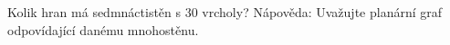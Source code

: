 Kolik hran má sedmnáctistěn s 30 vrcholy? Nápověda: Uvažujte planární graf
odpovídající danému mnohostěnu.
